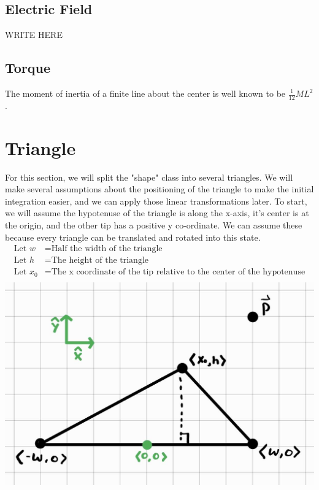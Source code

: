 \documentclass{article}
\begin{document}
\subsection{Electric Field}
WRITE HERE
\subsection{Torque}
The moment of inertia of a finite line about the center is well known to be $\frac{1}{12}ML^2$.

\section{Triangle}
For this section, we will split the "shape" class into several triangles. We will make several assumptions about the positioning of the triangle to make the initial integration easier, and we can apply those linear transformations later. To start, we will assume the hypotenuse of the triangle is along the x-axis, it's center is at the origin, and the other tip has a positive y co-ordinate. We can assume these because every triangle can be translated and rotated into this state.
\begin{align*}
    \text{Let } w &= \text{Half the width of the triangle}\\
    \text{Let } h &= \text{The height of the triangle}\\
    \text{Let } x_0 &= \text{The x coordinate of the tip relative to the center of the hypotenuse}\\
\end{align*}
\includegraphics[scale=0.25]{triangle_setup.jpg}
\end{document}
